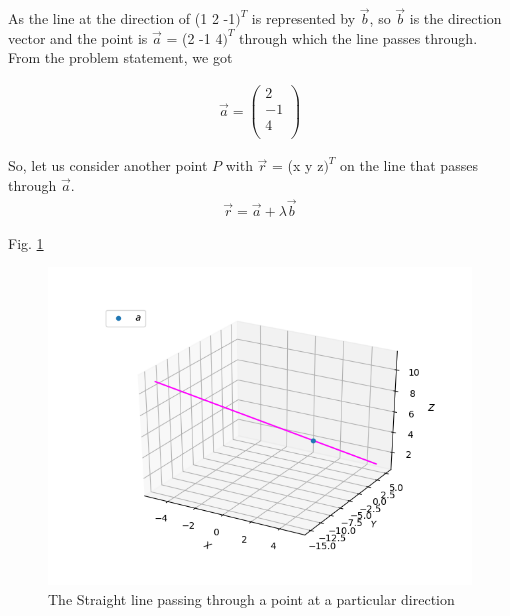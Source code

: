 
As the line at the direction of (1  2  -1$)^T$ is represented by $\vec{b}$, so $\vec{b}$ is the direction vector and the point is $\vec{a}$ = (2  -1  4$)^T$ through which the line passes through.\\
From the problem statement, we got

\begin{align}
\vec{a} = \begin{pmatrix}
      2 \\ 
      -1 \\
      4 \\
      \end{pmatrix} 
\end{align}

So, let us consider another point $P$ with $\vec{r}$ = (x y z$)^T$ on the line that passes through $\vec{a}$. \\

\begin{align}
\vec{r} = \vec{a} + \lambda \vec{b} 
\end{align}

 Fig. \ref{fig:solutions/line_plane/68point_distance}

\begin{figure}[!ht]
\centering
\includegraphics[width=\columnwidth]{./solutions/line_plane/68/figs/line_Eqn3.png}
\caption{The Straight line passing through a point at a particular direction}
\label{fig:solutions/line_plane/68point_distance}
\end{figure}

